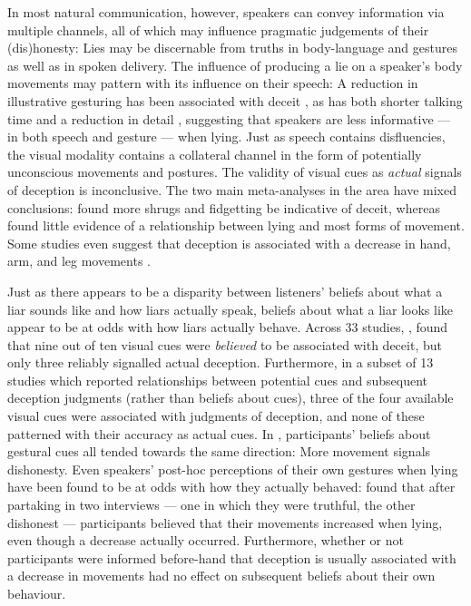 \documentclass[a4paper,man,natbib]{apa6}
\begin{document}
In most natural communication, however, speakers can convey information via multiple channels, all of which may influence pragmatic judgements of their (dis)honesty: 
Lies may be discernable from truths in body-language and gestures as well as in spoken delivery.
The influence of producing a lie on a speaker's body movements may pattern with its influence on their speech: 
A reduction in illustrative gesturing has been associated with deceit \citep{DePaulo2003, Cohen2010}, as has both shorter talking time and a reduction in detail \citep{DePaulo2003}, suggesting that speakers are less informative --- in both speech and gesture --- when lying. 
Just as speech contains disfluencies, the visual modality contains a collateral channel in the form of potentially unconscious movements and postures.
The validity of visual cues as \emph{actual} signals of deception is inconclusive.
The two main meta-analyses in the area have mixed conclusions: \citet{Zuckerman1981} found more shrugs and fidgetting be indicative of deceit, whereas \citet{DePaulo2003} found little evidence of a relationship between lying and most forms of movement.
Some studies even suggest that deception is associated with a decrease in hand, arm, and leg movements \citep[e.g.][]{DePaulo1992, Ekman1989, Vrij1995}.

Just as there appears to be a disparity between listeners' beliefs about what a liar sounds like and how liars actually speak, beliefs about what a liar looks like appear to be at odds with how liars actually behave.
Across 33 studies, \citet{Zuckerman1981}, found that nine out of ten visual cues were \emph{believed} to be associated with deceit, but only three reliably signalled actual deception.
Furthermore, in a subset of 13 studies which reported relationships between potential cues and subsequent deception judgments (rather than beliefs about cues), three of the four available visual cues were associated with judgments of deception, and none of these patterned with their accuracy as actual cues.  
In \citet{Zuckerman1981}, participants' beliefs about gestural cues all tended towards the same direction: 
More movement signals dishonesty. 
Even speakers' post-hoc perceptions of their own gestures when lying have been found to be at odds with how they actually behaved:
\citet{Vrij1996} found that after partaking in two interviews --- one in which they were truthful, the other dishonest --- participants believed that their movements increased when lying, even though a decrease actually occurred.
Furthermore, whether or not participants were informed before-hand that deception is usually associated with a decrease in movements had no effect on subsequent beliefs about their own behaviour.
\end{document}

